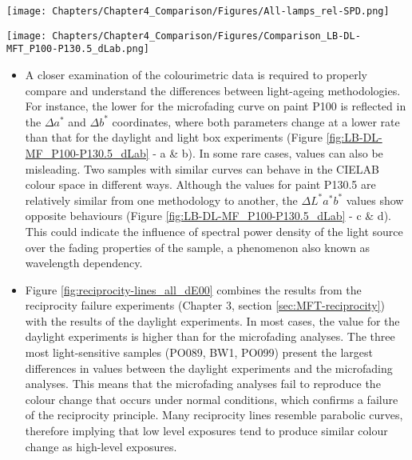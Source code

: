 \begin{figure*}[!h]
\centering
\texttt{[image: Chapters/Chapter4\_Comparison/Figures/All-lamps\_rel-SPD.png]}
\caption[\hspace{0.3cm}Relative SPD of the light sources used in the light-ageing experiments]{Relative spectral power distribution of the fading light sources used in the light-ageing experiments.}
\label{fig:lamps_rel-SP}
\end{figure*}

\begin{figure*}[!h]
\centering
\texttt{[image: Chapters/Chapter4\_Comparison/Figures/Comparison\_LB-DL-MFT\_P100-P130.5\_dLab.png]}
\caption[\hspace{0.3cm}$\Delta L^*a^*b^*$ values for paint sample P100 and P130.5]{$\Delta L^*a^*b^*$ values for paint sample P100 (a - b) and P130.5 (c - d).}
\label{fig:LB-DL-MF_P100-P130.5_dLab}
\end{figure*}
    
\newpage
\begin{itemize}   
    
    \item A closer examination of the colourimetric data is required to properly compare and understand the differences between light-ageing methodologies. For instance, the lower \dEOO for the microfading curve on paint P100 is reflected in the $\Delta a^*$ and $\Delta b^*$ coordinates, where both parameters change at a lower rate than that for the daylight and light box experiments (Figure \ref{fig:LB-DL-MF_P100-P130.5_dLab} - a \& b). In some rare cases, \dE values can also be misleading. Two samples with similar \dEOO curves can behave in the CIELAB colour space in different ways. Although the \dEOO values for paint P130.5 are relatively similar from one methodology to another, the $\Delta L^*a^*b^*$ values show opposite behaviours (Figure \ref{fig:LB-DL-MF_P100-P130.5_dLab} - c \& d). This could indicate the influence of spectral power density of the light source over the fading properties of the sample, a phenomenon also known as wavelength dependency. 


    \item Figure \ref{fig:reciprocity-lines_all_dE00} combines the results from the reciprocity failure experiments (Chapter 3, section \ref{sec:MFT-reciprocity}) with the results of the daylight experiments. In most cases, the \dEOO value for the daylight experiments is higher than for the microfading analyses. The three most light-sensitive samples (PO089, BW1, PO099) present the largest differences in \dEOO values between the daylight experiments and the microfading analyses. This means that the microfading analyses fail to reproduce the colour change that occurs under normal conditions, which confirms a failure of the reciprocity principle. Many reciprocity lines resemble parabolic curves, therefore implying that low level exposures tend to produce similar colour change as high-level exposures.
\end{itemize}



